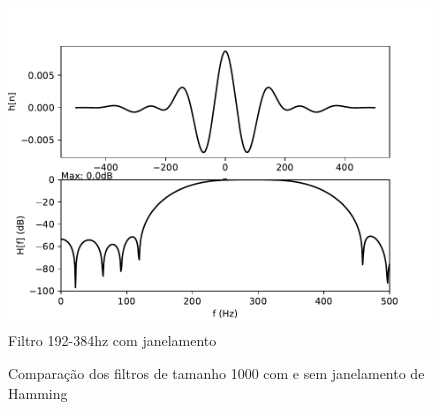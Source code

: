 \begin{figure}[H]
\begin{center}
            \includegraphics[scale=0.4]{fig/windowfilter3.pdf}\\
            \small{Filtro 192-384hz com janelamento}
        \end{center}
    \endminipage
    \begin{center}
        \caption{Comparação dos filtros de tamanho 1000 com e sem janelamento de Hamming}
        \label{fig:low 1000}
    \end{center}
\end{figure}
